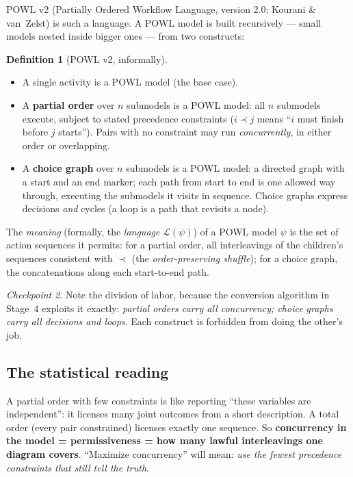 \documentclass[11pt]{article}
\theoremstyle{definition}
\newtheorem{definition}{Definition}[section]
\theoremstyle{plain}
\theoremstyle{remark}
\newtheorem{checkpoint}[definition]{Checkpoint}
\begin{document}
POWL v2 (Partially Ordered Workflow Language, version 2.0; Kourani \&
van~Zelst) is such a language. A POWL model is built recursively --- small
models nested inside bigger ones --- from two constructs:

\begin{definition}[POWL v2, informally]
\begin{itemize}[nosep]
  \item A single activity is a POWL model (the base case).
  \item A \textbf{partial order} over $n$ submodels is a POWL model: all
  $n$ submodels execute, subject to stated precedence constraints
  ($i \prec j$ means ``$i$ must finish before $j$ starts''). Pairs with no
  constraint may run \emph{concurrently}, in either order or overlapping.
  \item A \textbf{choice graph} over $n$ submodels is a POWL model: a
  directed graph with a start and an end marker; each path from start to end
  is one allowed way through, executing the submodels it visits in sequence.
  Choice graphs express decisions \emph{and} cycles (a loop is a path that
  revisits a node).
\end{itemize}
\end{definition}

The \emph{meaning} (formally, the \emph{language}
$\mathcal{L}(\psi)$) of a POWL model $\psi$ is the set of action sequences
it permits: for a partial order, all interleavings of the children's
sequences consistent with $\prec$ (the \emph{order-preserving shuffle});
for a choice graph, the concatenations along each start-to-end path.

\begin{checkpoint}
Note the division of labor, because the conversion algorithm in
Stage~4 exploits it exactly: \emph{partial orders carry all concurrency;
choice graphs carry all decisions and loops}. Each construct is forbidden
from doing the other's job.
\end{checkpoint}

\subsection{The statistical reading}

A partial order with few constraints is like reporting ``these variables are
independent'': it licenses many joint outcomes from a short description.
A total order (every pair constrained) licenses exactly one sequence. So
\textbf{concurrency in the model = permissiveness = how many lawful
interleavings one diagram covers}. ``Maximize concurrency'' will mean:
\emph{use the fewest precedence constraints that still tell the truth}.
\end{document}
